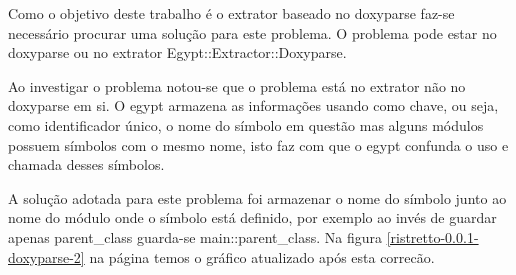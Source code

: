Como o objetivo deste trabalho é o extrator baseado no doxyparse faz-se
necessário procurar uma solução para este problema. O problema pode estar no
doxyparse ou no extrator Egypt::Extractor::Doxyparse.

Ao investigar o problema notou-se que o problema está no extrator não no
doxyparse em si. O egypt armazena as informações usando como chave, ou seja,
como identificador único, o nome do símbolo em questão mas alguns módulos
possuem símbolos com o mesmo nome, isto faz com que o egypt confunda o uso e
chamada desses símbolos.

A solução adotada para este problema foi armazenar o nome do símbolo junto ao
nome do módulo onde o símbolo está definido, por exemplo ao invés de guardar
apenas parent\_class guarda-se main::parent\_class.  Na figura
\ref{ristretto-0.0.1-doxyparse-2} na página
\pageref{ristretto-0.0.1-doxyparse-2} temos o gráfico atualizado após esta
correcão.

